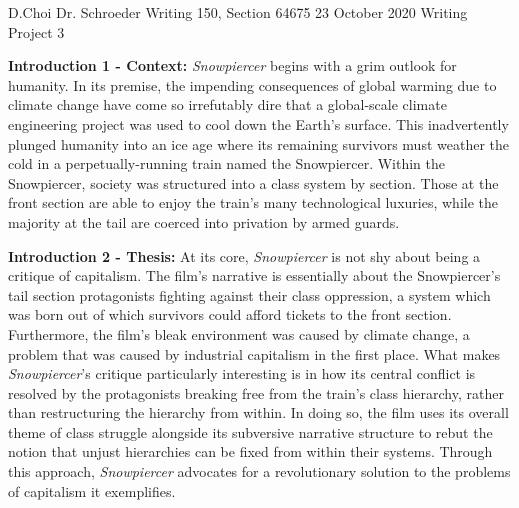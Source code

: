 \documentclass[12pt, letterpaper]{article}
\begin{document}
\begin{mla}
	{D.}{Choi}
	{Dr. Schroeder}
	{Writing 150, Section 64675}
	{23 October 2020}
	{Writing Project 3}


\textbf{Introduction 1 - Context:} \textit{Snowpiercer} begins with a grim
outlook for humanity. In its premise, the impending consequences of global
warming due to climate change have come so irrefutably dire that a
global-scale climate engineering project was used to cool down the Earth's
surface. This inadvertently plunged humanity into an ice age where its
remaining survivors must weather the cold in a perpetually-running train named
the Snowpiercer. Within the Snowpiercer, society was structured into a class
system by section. Those at the front section are able to enjoy the train's
many technological luxuries, while the majority at the tail are coerced into
privation by armed guards.

\textbf{Introduction 2 - Thesis:} At its core, \textit{Snowpiercer} is not shy
about being a critique of capitalism. The film's narrative is essentially
about the Snowpiercer's tail section protagonists fighting against their class
oppression, a system which was born out of which survivors could afford
tickets to the front section. Furthermore, the film's bleak environment was
caused by climate change, a problem that was caused by industrial capitalism
in the first place. What makes \textit{Snowpiercer}'s critique particularly
interesting is in how its central conflict is resolved by the protagonists
breaking free from the train's class hierarchy, rather than restructuring the
hierarchy from within. In doing so, the film uses its overall theme of class
struggle alongside its subversive narrative structure to rebut the notion that
unjust hierarchies can be fixed from within their systems. Through this
approach, \textit{Snowpiercer} advocates for a revolutionary solution to the
problems of capitalism it exemplifies.


\begin{workscited}
\end{workscited}


\end{mla}
\end{document}
